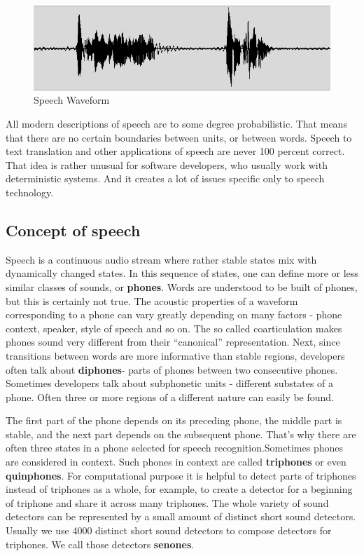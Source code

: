 \documentclass[12pt,a4paper,oldfontcommands]{memoir}
\begin{document}
\begin{figure}[h]
    \centering
    \includegraphics[scale=0.5]{waveform}
    \caption{Speech Waveform}
\end{figure}

All modern descriptions of speech are to some degree probabilistic. That means that there are no certain boundaries between units, or between words. Speech to text translation and other applications of speech are never 100 percent correct. That idea is rather unusual for software developers, who usually work with deterministic systems. And it creates a lot of issues specific only to speech technology. 


\subsection{Concept of speech}
Speech is a continuous audio stream where rather stable states mix with dynamically changed states. In this sequence of states, one can define more or less similar classes of sounds, or \textbf{phones}. Words are understood to be built of phones, but this is certainly not true. The acoustic properties of a waveform corresponding to a phone can vary greatly depending on many factors - phone context, speaker, style of speech and so on. The so called coarticulation makes phones sound very different from their “canonical” representation. Next, since transitions between words are more informative than stable regions, developers often talk about \textbf{diphones}- parts of phones between two consecutive phones. Sometimes developers talk about subphonetic units - different substates of a phone. Often three or more regions of a different nature can easily be found.

The first part of the phone depends on its preceding phone, the middle part is stable, and the next part depends on the subsequent phone. That's why there are often three states in a phone selected for speech recognition.Sometimes phones are considered in context. Such phones in context are called \textbf{triphones} or even \textbf{quinphones}. For computational purpose it is helpful to detect parts of triphones instead of triphones as a whole, for example, to create a detector for a beginning of triphone and share it across many triphones. The whole variety of sound detectors can be represented by a small amount of distinct short sound detectors. Usually we use 4000 distinct short sound detectors to compose detectors for triphones. We call those detectors \textbf{senones}. 
\end{document}
